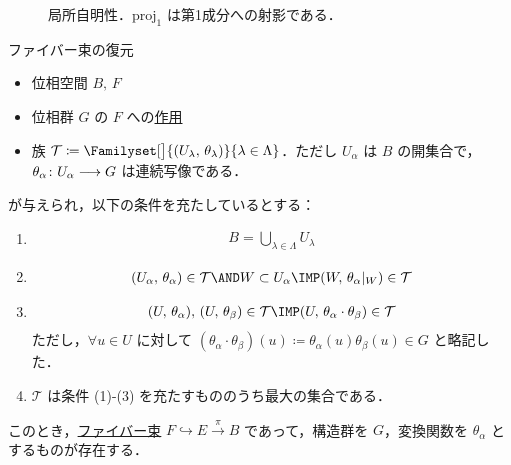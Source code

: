 \documentclass[algtopo_main]{subfiles}
\begin{document}
\begin{figure}[H]
    \centering
    \caption{局所自明性．$\mathrm{proj}_1$ は第1成分への射影である．}
    \label{cmtd:FB-LT}
\end{figure}%



\begin{myprop}[label=prop:cocycle]{ファイバー束の復元}
	\begin{itemize}
        \item 位相空間 $B,\, F$
        \item 位相群 $G$ の $F$ への\hyperref[def:TG-action]{作用}
        \item 族 $\mathcal{T} \coloneqq \Familyset[\big]{(U_\lambda,\, \theta_\lambda)}{\lambda \in \Lambda}$．ただし $U_\alpha$ は $B$ の開集合で，$\theta_\alpha \colon U_\alpha \longrightarrow G$ は連続写像である．
    \end{itemize}
    が与えられ，以下の条件を充たしているとする：
    \begin{enumerate}
        \item 
        \begin{align}
            B = \bigcup_{\lambda \in \Lambda} U_\lambda
        \end{align}
        \item \begin{align}
            (U_\alpha,\, \theta_\alpha) \in \mathcal{T} \AND W \subset U_\alpha\IMP (W,\, \theta_\alpha|_W) \in \mathcal{T}
        \end{align}
        \item 
        \begin{align}
            (U,\, \theta_\alpha),\, (U,\, \theta_\beta) \in \mathcal{T} \IMP (U,\, \theta_\alpha \cdot \theta_\beta) \in \mathcal{T}
        \end{align}
        ただし，$\forall u \in U$ に対して $(\theta_\alpha \cdot \theta_\beta)(u) \coloneqq \theta_\alpha (u) \theta_\beta (u) \in G$ と略記した．
        \item $\mathcal{T}$ は条件 (1)-(3) を充たすもののうち最大の集合である．
    \end{enumerate}
    
	このとき，\hyperref[def:FB]{ファイバー束} $F \hookrightarrow E \xrightarrow{\pi} B$ であって，構造群を $G$，変換関数を $\theta_\alpha$ とするものが存在する．
\end{myprop}
\end{document}
